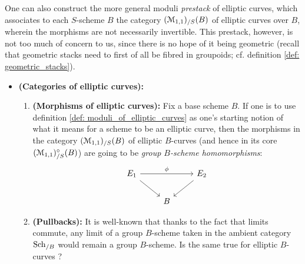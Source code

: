                 \begin{remark} \label{remark: categories_of_elliptic_curves}
                    One can also construct the more general moduli \textit{prestack} of elliptic curves, which associates to each $S$-scheme $B$ the category $(\mathcal{M}_{1, 1})_{/S}(B)$ of elliptic curves over $B$, wherein the morphisms are not necessarily invertible. This prestack, however, is not too much of concern to us, since there is no hope of it being geometric (recall that geometric stacks need to first of all be fibred in groupoids; cf. definition \ref{def: geometric_stacks}).
                \end{remark}
                \begin{remark} \label{remark: moduli_of_elliptic_curves_disambiguations}
                    \noindent
                    \begin{itemize}
                        \item \textbf{(Categories of elliptic curves):}
                            \begin{enumerate}
                                \item \textbf{(Morphisms of elliptic curves):} Fix a base scheme $B$. If one is to use definition \ref{def: moduli_of_elliptic_curves} as one's starting notion of what it means for a scheme to be an elliptic curve, then the morphisms in the category $(\mathcal{M}_{1, 1})_{/S}(B)$ of elliptic $B$-curves (and hence in its core $(\mathcal{M}_{1, 1})_{/S}^{\circ}(B)$) are going to be \textit{group $B$-scheme homomorphisms}:
                                    $$
                                        \begin{tikzcd}
                                        	{E_1} && {E_2} \\
                                        	& B
                                        	\arrow[from=1-3, to=2-2]
                                        	\arrow["\phi", from=1-1, to=1-3]
                                        	\arrow[from=1-1, to=2-2]
                                        \end{tikzcd}
                                    $$
                                \item \textbf{(Pullbacks):} It is well-known that thanks to the fact that limits commute, any limit of a group $B$-scheme taken in the ambient category $\mathrm{Sch}_{/B}$ would remain a group $B$-scheme. Is the same true for elliptic $B$-curves ? 
                                

\end{enumerate}
\end{itemize}
\end{remark}
